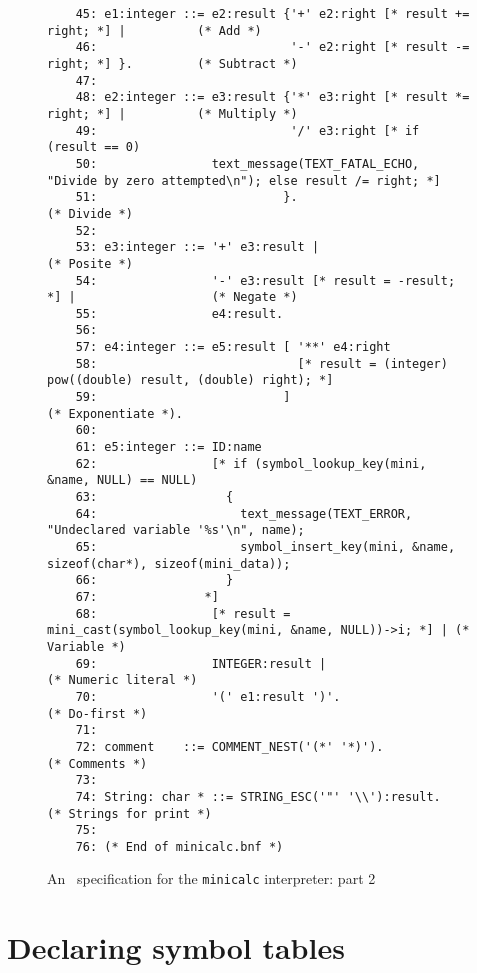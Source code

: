 \begin{figure}
\hspace*{-2.5cm}
\begin{minipage}{30cm}
\footnotesize
\begin{verbatim}
    45: e1:integer ::= e2:result {'+' e2:right [* result += right; *] |          (* Add *)
    46:                           '-' e2:right [* result -= right; *] }.         (* Subtract *)
    47: 
    48: e2:integer ::= e3:result {'*' e3:right [* result *= right; *] |          (* Multiply *)
    49:                           '/' e3:right [* if (result == 0) 
    50:                text_message(TEXT_FATAL_ECHO, "Divide by zero attempted\n"); else result /= right; *] 
    51:                          }.                                              (* Divide *)
    52: 
    53: e3:integer ::= '+' e3:result |                                           (* Posite *)
    54:                '-' e3:result [* result = -result; *] |                   (* Negate *)
    55:                e4:result.
    56: 
    57: e4:integer ::= e5:result [ '**' e4:right 
    58:                            [* result = (integer) pow((double) result, (double) right); *] 
    59:                          ]                                               (* Exponentiate *).
    60: 
    61: e5:integer ::= ID:name 
    62:                [* if (symbol_lookup_key(mini, &name, NULL) == NULL)
    63:                  {
    64:                    text_message(TEXT_ERROR, "Undeclared variable '%s'\n", name);
    65:                    symbol_insert_key(mini, &name, sizeof(char*), sizeof(mini_data));
    66:                  }
    67:               *]
    68:                [* result = mini_cast(symbol_lookup_key(mini, &name, NULL))->i; *] | (* Variable *)
    69:                INTEGER:result |                                          (* Numeric literal *)
    70:                '(' e1:result ')'.                                        (* Do-first *)
    71: 
    72: comment    ::= COMMENT_NEST('(*' '*)').                                  (* Comments *)
    73: 
    74: String: char * ::= STRING_ESC('"' '\\'):result.                          (* Strings for print *)
    75: 
    76: (* End of minicalc.bnf *)
\end{verbatim}
\end{minipage}
\caption{An \rdp\ specification for the {\tt minicalc} interpreter: part 2}
\label{minicalc:interp2}
\end{figure}

\section{Declaring symbol tables}

